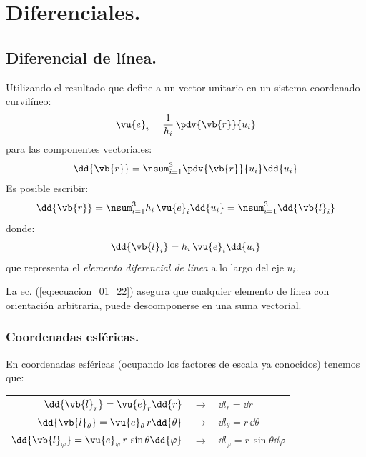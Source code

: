 \section{Diferenciales.}

\subsection{Diferencial de línea.}

Utilizando el resultado que define a un vector unitario en un sistema coordenado curvilíneo:
\begin{align*}
\vu{e}_{i} = \dfrac{1}{h_{i}} \, \pdv{\vb{r}}{u_{i}}
\end{align*}
para las componentes vectoriales:
\begin{align*}
\dd{\vb{r}} = \nsum_{i=1}^{3} \pdv{\vb{r}}{u_{i}} \dd{u_{i}}
\end{align*}
Es posible escribir:
\begin{align}
\dd{\vb{r}} = \nsum_{i=1}^{3} h_{i} \, \vu{e}_{i} \dd{u_{i}} = \nsum_{i=1}^{3} \dd{\vb{l}_{i}}
\label{eq:ecuacion_01_21}
\end{align}
donde:
\begin{align}
\dd{\vb{l}_{i}} = h_{i} \, \vu{e}_{i} \dd{u_{i}}
\label{eq:ecuacion_01_22}
\end{align}
que representa el \emph{elemento diferencial de línea} a lo largo del eje $u_{i}$.
\par
La ec. (\ref{eq:ecuacion_01_22}) asegura que cualquier elemento de línea con orientación arbitraria, puede descomponerse en una suma vectorial.

\subsubsection{Coordenadas esféricas.}

En coordenadas esféricas (ocupando los factores de escala ya conocidos) tenemos que:
\begin{table}[H]
\centering
\fontsize{14}{14}\selectfont
\begin{tabular}{r  c  l}
$\dd{\vb{l}_{r}} = \vu{e}_{r} \dd{r}$ & $\longrightarrow$ & $\dd{l_{r}} = \dd{r}$ \\
$\dd{\vb{l}_{\theta}} = \vu{e}_{\theta} \, r \dd{\theta}$ & $\longrightarrow$ & $\dd{l_{\theta}} = r \, \dd{\theta}$ \\
$\dd{\vb{l}_{\varphi}} = \vu{e}_{\varphi} \, r \, \sin \theta \dd{\varphi}$ & $\longrightarrow$ & $\dd{l_{\varphi}} = r \, \sin \theta \dd{\varphi}$ \\
\end{tabular}
\end{table}

